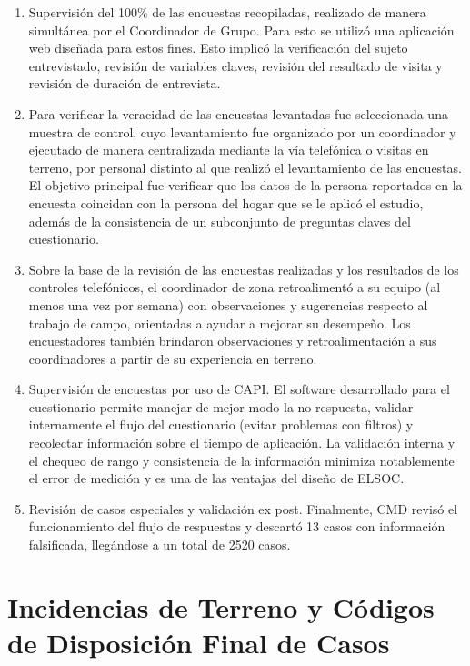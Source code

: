 \documentclass[
  openany]{book}
\begin{document}
\begin{enumerate}
\def\labelenumi{\arabic{enumi}.}
\item
  Supervisión del 100\% de las encuestas recopiladas, realizado de manera simultánea por el Coordinador de Grupo. Para esto se utilizó una aplicación web diseñada para estos fines. Esto implicó la verificación del sujeto entrevistado, revisión de variables claves, revisión del resultado de visita y revisión de duración de entrevista.
\item
  Para verificar la veracidad de las encuestas levantadas fue seleccionada una muestra de control, cuyo levantamiento fue organizado por un coordinador y ejecutado de manera centralizada mediante la vía telefónica o visitas en terreno, por personal distinto al que realizó el levantamiento de las encuestas. El objetivo principal fue verificar que los datos de la persona reportados en la encuesta coincidan con la persona del hogar que se le aplicó el estudio, además de la consistencia de un subconjunto de preguntas claves del cuestionario.
\item
  Sobre la base de la revisión de las encuestas realizadas y los resultados de los controles telefónicos, el coordinador de zona retroalimentó a su equipo (al menos una vez por semana) con observaciones y sugerencias respecto al trabajo de campo, orientadas a ayudar a mejorar su desempeño. Los encuestadores también brindaron observaciones y retroalimentación a sus coordinadores a partir de su experiencia en terreno.
\item
  Supervisión de encuestas por uso de CAPI. El software desarrollado para el cuestionario permite manejar de mejor modo la no respuesta, validar internamente el flujo del cuestionario (evitar problemas con filtros) y recolectar información sobre el tiempo de aplicación. La validación interna y el chequeo de rango y consistencia de la información minimiza notablemente el error de medición y es una de las ventajas del diseño de ELSOC.
\item
  Revisión de casos especiales y validación ex post. Finalmente, CMD revisó el funcionamiento del flujo de respuestas y descartó 13 casos con información falsificada, llegándose a un total de 2520 casos.
\end{enumerate}

\hypertarget{incidencias-de-terreno-y-cuxf3digos-de-disposiciuxf3n-final-de-casos}{%
\section{Incidencias de Terreno y Códigos de Disposición Final de Casos}\label{incidencias-de-terreno-y-cuxf3digos-de-disposiciuxf3n-final-de-casos}}
\end{document}
